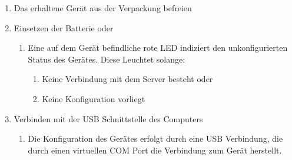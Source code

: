 \documentclass[pointlessnumbers]{scrartcl}
\begin{document}
\begin{enumerate}
  
  \item Das erhaltene Gerät aus der Verpackung befreien 
  
  \item Einsetzen der Batterie oder 
  \begin{enumerate}
    \item  Eine auf dem Gerät befindliche rote LED indiziert den unkonfigurierten Status des Gerätes. Diese Leuchtet solange:
    \begin{enumerate}
      \item Keine Verbindung mit dem Server besteht oder 
      \item Keine Konfiguration vorliegt
    \end{enumerate}
  \end{enumerate}
  
  \item Verbinden mit der USB Schnittstelle des Computers 
    \begin{enumerate}
      \item Die Konfiguration des Gerätes erfolgt durch eine USB Verbindung, die durch einen virtuellen COM Port die Verbindung zum Gerät herstellt. 
    \end{enumerate}
    

\end{enumerate}
\end{document}

